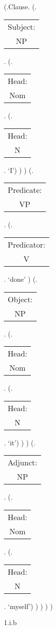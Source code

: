 \documentclass[12pt,letterpaper]{article}
\begin{document}
		\begin{figure}
			\begin{center}
				\begin{parsetree}
					(.Clause.
						(.\begin{tabular}{c}Subject:\\NP\end{tabular}.  
							(.\begin{tabular}{c}Head:\\Nom\end{tabular}.
								(.\begin{tabular}{c}Head:\\N\end{tabular}. `I')
							)
						)
					(.\begin{tabular}{c}Predicate:\\VP\end{tabular}.
					(.\begin{tabular}{c}Predicator:\\V\end{tabular}.    `done' )
					(.\begin{tabular}{c}Object:\\NP\end{tabular}. 
					(.\begin{tabular}{c}Head:\\Nom\end{tabular}.  
					(.\begin{tabular}{c}Head:\\N\end{tabular}. `it')
					)
					)
					(.\begin{tabular}{c}Adjunct:\\NP\end{tabular}.
					(.\begin{tabular}{c}Head:\\Nom\end{tabular}.
					(.\begin{tabular}{c}Head:\\N\end{tabular}. `myself')
					)
					)
					)
					)
					
					\hfill \break\hfill \break
				\end{parsetree}
				1.i.b
			\end{center}
		\end{figure}
	
\end{document}
